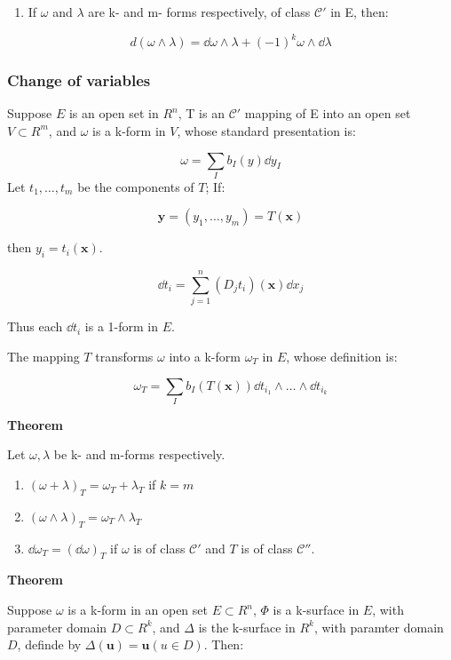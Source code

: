 \documentclass[11pt]{article}
\begin{document}
\begin{enumerate}
\item If \(\omega\) and \(\lambda\) are k- and m- forms respectively, of class \(\mathcal{C}'\) in E, then:
\end{enumerate}

\[
d(\omega \wedge \lambda) = \dd{\omega} \wedge \lambda + (-1)^k \omega \wedge \dd{\lambda}
\]

\subsubsection{Change of variables}
\label{sec:orgba26ca2}

Suppose \(E\) is an open set in \(R^n\), T is an \(\mathcal{C}'\) mapping of E into an open set \(V \subset R^m\), and \(\omega\) is a k-form in \(V\), whose standard presentation is:

\[
\omega = \sum_I b_I(y) \dd{y}_I
\]
Let \(t_1,\ldots,t_m\) be the components of \(T\); If:

\[
\bm{y} = (y_1,\ldots,y_m) = T(\bm{x})
\]

then \(y_i = t_i(\bm{x})\).

\[
\dd{t_i} = \sum_{j=1}^n (D_j t_i)(\bm{x})\dd{x_j}
\]

Thus each \(\dd{t_i}\) is a 1-form in \(E\).

The mapping \(T\) transforms \(\omega\) into a k-form \(\omega_T\) in \(E\), whose definition is:

\[
\omega_T = \sum_I b_I(T(\bm{x})) \dd{t_{i_1}} \wedge \ldots\wedge \dd{t_{i_k}}
\]

\textbf{Theorem}

Let \(\omega,\lambda\) be k- and m-forms respectively.

\begin{enumerate}
\item \((\omega + \lambda)_T = \omega_T + \lambda_T\) if \(k=m\)
\item \((\omega \wedge \lambda)_T = \omega_T \wedge \lambda_T\)
\item \(\dd{\omega_T} = (\dd{\omega})_T\) if \(\omega\) is of class \(\mathcal{C}'\) and \(T\) is of class \(\mathcal{C}''\).
\end{enumerate}

\textbf{Theorem}

Suppose \(\omega\) is a k-form in an open set \(E \subset R^n\), \(\Phi\) is a k-surface in \(E\), with parameter domain \(D \subset R^k\), and \(\Delta\) is the k-surface in \(R^k\), with paramter domain \(D\), definde by \(\Delta(\bm{u}) = \bm{u}(u\in D)\). Then:
\end{document}
